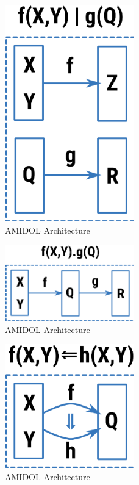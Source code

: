 \documentclass[12pt]{galois-whitepaper}
\begin{document}
\begin{figure}
  \centering
  \includegraphics[width=0.5\textwidth]{figs/parallel.png}
  \caption{AMIDOL Architecture}
  \label{Fig:Arch}
\end{figure}

\begin{figure}
  \centering
  \includegraphics[width=0.5\textwidth]{figs/serial.png}
  \caption{AMIDOL Architecture}
  \label{Fig:Arch}
\end{figure}

\begin{figure}
  \centering
  \includegraphics[width=0.5\textwidth]{figs/substitution.png}
  \caption{AMIDOL Architecture}
  \label{Fig:Arch}
\end{figure}
\end{document}
